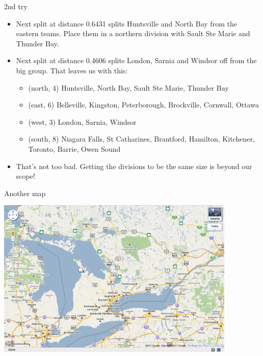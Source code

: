 \documentclass[pdf]{prosper}
\begin{document}
\begin{slide}{2nd try}

  \begin{itemize}
  \item Next split at distance 0.6431 splits Huntsville and North Bay from the eastern teams. Place them in a northern division with Sault Ste Marie and Thunder Bay.
  \item Next split at distance 0.4606 splits London, Sarnia and Windsor off from the big group. That leaves us with this:
    \begin{itemize}
    \item (north, 4) Huntsville, North Bay, Sault Ste Marie, Thunder Bay
    \item (east, 6) Belleville, Kingston, Peterborough, Brockville, Cornwall, Ottawa
    \item (west, 3) London, Sarnia, Windsor
    \item (south, 8) Niagara Falls, St Catharines, Brantford, Hamilton, Kitchener, Toronto, Barrie, Owen Sound
    \end{itemize}
  \item That's not too bad. Getting the divisions to be the same size is beyond our scope!
  \end{itemize}
  
\end{slide}

\begin{slide}{Another map}

\includegraphics[width=4.5in]{ontario}
  
\end{slide}
\end{document}
